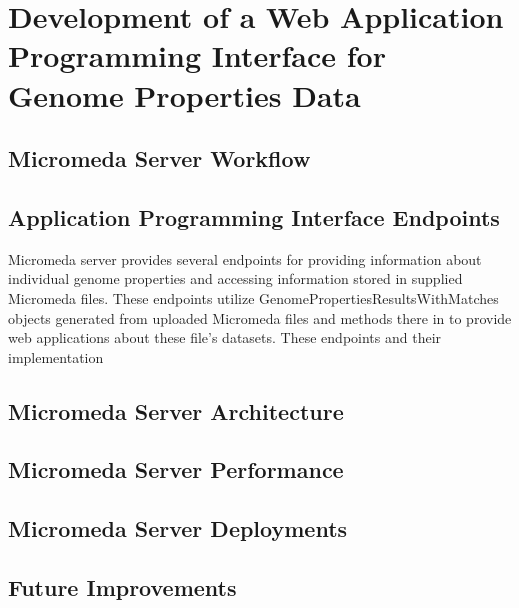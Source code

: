 \chapter{Development of a Web Application Programming Interface for Genome Properties Data}

\section{Micromeda Server Workflow}

\section{Application Programming Interface Endpoints}

Micromeda server provides several endpoints for providing information about individual genome properties and accessing information stored in supplied Micromeda files. These endpoints utilize GenomePropertiesResultsWithMatches objects generated from uploaded Micromeda files and methods there in to provide web applications about these file's datasets. These endpoints and their implementation

\section{Micromeda Server Architecture}



\section{Micromeda Server Performance}

\section{Micromeda Server Deployments}

\section{Future Improvements}
